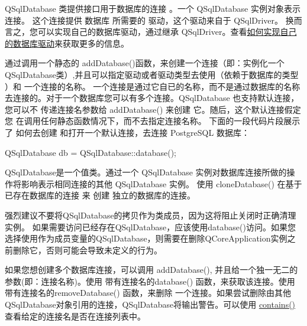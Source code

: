 QSqlDatabase 类提供接口用于数据库的连接 。一个 QSqlDatabase 实例对象表示连接。 这个连接提供 数据库 所需要的 驱动，这个驱动来自于 QSqlDriver。 换而言之，您可以实现自己的数据库驱动，通过继承 QSqlDriver。查看\href{https://doc.qt.io/qt-5/sql-driver.html#how-to-write-your-own-database-driver}{如何实现自己的数据库驱动}来获取更多的信息。

通过调用一个静态的 addDatabase()函数，来创建一个连接（即：实例化一个QSqlDatabase类）,并且可以指定驱动或者驱动类型去使用（依赖于数据库的类型 ）和 一个连接的名称。 一个连接是通过它自已的名称，而不是通过数据库的名称去连接的。对于一个数据库您可以有多个连接。QSqlDatabase 也支持默认连接，您可以不 传递连接名参数给 addDatabase() 来创建 它。随后，这个默认连接假定您 在调用任何静态函数情况下，而不去指定连接名称。 下面的一段代码片段展示了 如何去创建 和打开一个默认连接，去连接 PostgreSQL 数据库：

\begin{cppcode}
QSqlDatabase db = QSqlDatabase::database();
\end{cppcode}

QSqlDatabase是一个值类。通过一个 QSqlDatabase 实例对数据库连接所做的操作将影响表示相同连接的其他 QSqlDatabase 实例。 使用 cloneDatabase() 在基于已存在数据库的连接 来 创建 独立的数据库的连接。

\begin{warning}
强烈建议不要将QSqlDatabase的拷贝作为类成员，因为这将阻止关闭时正确清理实例。 如果需要访问已经存在QSqlDatabase，应该使用database()访问。如果您选择使用作为成员变量的QSqlDatabase，则需要在删除QCoreApplication实例之前删除它，否则可能会导致未定义的行为。
\end{warning}

如果您想创建多个数据库连接，可以调用 addDatabase(), 并且给一个独一无二的参数(即：连接名称)。使用 带有连接名的database() 函数，来获取该连接。使用 带有连接名的removeDatabase() 函数，来删除 一个连接。如果尝试删除由其他QSqlDatabase对象引用的连接，QSqlDatabase将输出警告。可以使用 \href{https://github.com/QtDocumentCN/QtDocumentCN/blob/master/Src/S/QSqlDatabase/QSqlDatabase.md#static-bool-qsqldatabasecontainsconst-qstring-connectionname--qlatin1stringdefaultconnection}{contains()}查看给定的连接名是否在连接列表中。


